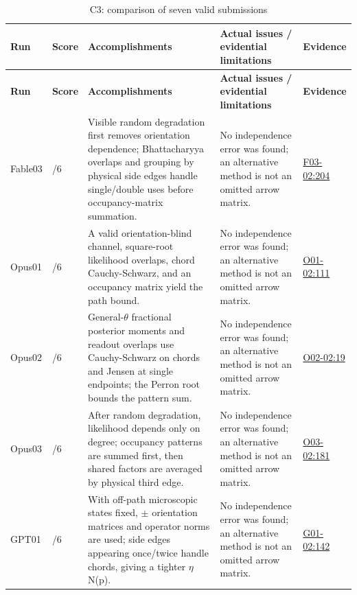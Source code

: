 \documentclass[11pt,a4paper]{article}
\begin{document}
{\fontsize{9.0}{12.6}\selectfont
\setlength{\tabcolsep}{2.5pt}
\begin{longtable}{>{\raggedright\arraybackslash}p{}>{\raggedright\arraybackslash}p{}>{\raggedright\arraybackslash}p{}>{\raggedright\arraybackslash}p{}>{\raggedright\arraybackslash}p{}}
\caption{C3: comparison of seven valid submissions}\\
\toprule
\textbf{Run} & \textbf{Score} & \textbf{Accomplishments} & \textbf{Actual issues /\allowbreak{} evidential limitations} & \textbf{Evidence}\tabularnewline
\midrule
\endfirsthead
\toprule
\textbf{Run} & \textbf{Score} & \textbf{Accomplishments} & \textbf{Actual issues /\allowbreak{} evidential limitations} & \textbf{Evidence}\tabularnewline
\midrule
\endhead
{}Fable03 & 6/\allowbreak{}6 & Visible random degradation first removes orientation dependence; Bhattacharyya overlaps and grouping by physical side edges handle single/\allowbreak{}double uses before occupancy-matrix summation. & No independence error was found; an alternative method is not an omitted arrow matrix. & \hyperref[src:F03-02]{F03-02:204}\tabularnewline
{}Opus01 & 6/\allowbreak{}6 & A valid orientation-blind channel,\allowbreak{} square-root likelihood overlaps,\allowbreak{} chord Cauchy-Schwarz,\allowbreak{} and an occupancy matrix yield the path bound. & No independence error was found; an alternative method is not an omitted arrow matrix. & \hyperref[src:O01-02]{O01-02:111}\tabularnewline
{}Opus02 & 6/\allowbreak{}6 & General-\ensuremath{\theta} fractional posterior moments and readout overlaps use Cauchy-Schwarz on chords and Jensen at single endpoints; the Perron root bounds the pattern sum. & No independence error was found; an alternative method is not an omitted arrow matrix. & \hyperref[src:O02-02]{O02-02:19}\tabularnewline
{}Opus03 & 6/\allowbreak{}6 & After random degradation,\allowbreak{} likelihood depends only on degree; occupancy patterns are summed first,\allowbreak{} then shared factors are averaged by physical third edge. & No independence error was found; an alternative method is not an omitted arrow matrix. & \hyperref[src:O03-02]{O03-02:181}\tabularnewline
{}GPT01 & 6/\allowbreak{}6 & With off-path microscopic states fixed,\allowbreak{} \ensuremath{\pm} orientation matrices and operator norms are used; side edges appearing once/\allowbreak{}twice handle chords,\allowbreak{} giving a tighter \ensuremath{\eta}N(p). & No independence error was found; an alternative method is not an omitted arrow matrix. & \hyperref[src:G01-02]{G01-02:142}\tabularnewline

\end{longtable}}
\end{document}
